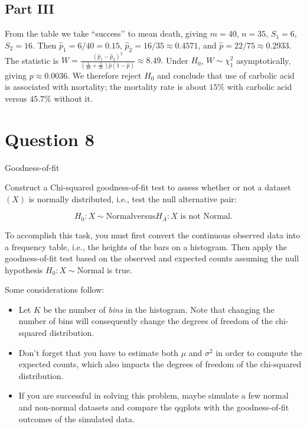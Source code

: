 \documentclass[letterpaper]{article}
\begin{document}
	\subsection{Part III}
	From the table we take “success’’ to mean death, giving
	$m=40$, $n=35$, $S_1=6$, $S_2=16$.
	Then $\hat p_1=6/40=0.15$, $\hat p_2=16/35\approx0.4571$, and
	$\hat p=22/75\approx0.2933$.
	The statistic is
	$
	W=\frac{(\hat p_1-\hat p_2)^2}
	{\left(\frac1{40}+\frac1{35}\right)\hat p(1-\hat p)}
	\approx 8.49.
	$
	Under $H_0$, $W\sim\chi^2_1$ asymptotically, giving
	$p\approx0.0036$.
	We therefore reject $H_0$ and conclude that use of carbolic acid is
	associated with mortality; the mortality rate is about $15\%$ with
	carbolic acid versus $45.7\%$ without it.
	
	
	\clearpage
	
	
	\section{Question 8}
	
	{\color{deepred} Goodness-of-fit}
	
	\medskip
	
	Construct a Chi-squared goodness-of-fit test to assess whether or not a dataset $(X)$ is normally distributed, i.e., test the null alternative pair:
	
	\[
	H_0 : X \sim \text{Normal}
	\text{versus} 
	H_A : X \text{ is not Normal}.
	\]
	
	To accomplish this task, you must first convert the continuous observed data into a frequency table, i.e., the heights of the bars on a histogram. 
	Then apply the goodness-of-fit test based on the observed and expected counts assuming the null hypothesis $H_0: X\sim\text{Normal}$ is true.
	
	Some considerations follow:
	
	\begin{itemize}
		
		\item Let $K$ be the number of \emph{bins} in the histogram. Note that changing the number of bins will consequently change the degrees of freedom of the chi-squared distribution.
		
		\item Don't forget that you have to estimate both $\mu$ and $\sigma^2$ in order to compute the expected counts, which also impacts the degrees of freedom of the chi-squared distribution.
		
		\item If you are successful in solving this problem, maybe simulate a few normal and non-normal datasets and compare the qqplots with the goodness-of-fit outcomes of the simulated data.
		
	\end{itemize}
	
\end{document}
